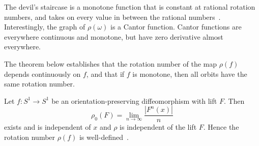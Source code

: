The devil's staircase is a monotone
function that is constant at rational rotation numbers, and takes on
every value in between the rational numbers~\cite{devaney}. Interestingly, the graph of $\rho(\omega)$ is a Cantor
function. Cantor functions are everywhere continuous and monotone, but have zero
derivative almost everywhere. 

The theorem below
establishes that the rotation number of the map $\rho(f)$
depends continuously on $f$, and that if $f$ is monotone, then all
orbits have the same rotation number.

\begin{singlespacing}
\begin{theorem}
Let $f:S^1 \to S^1$ be an orientation-preserving diffeomorphism with
lift $F$. Then
\begin{equation*}
\rho_0(F) = \lim_{n \to \infty} \frac{|F^n(x)|}{n}
\end{equation*}
exists and is independent of $x$ and $\rho$ is independent of the lift $F$. Hence the
rotation number $\rho(f)$ is well-defined~\cite{devaney}.
\end{theorem}
\end{singlespacing}

